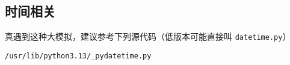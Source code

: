 \documentclass[a4paper,landscape,twocolumn]{ctexart}
\begin{document}
\subsection{时间相关}

真遇到这种大模拟，建议参考下列源代码（低版本可能直接叫 \texttt{datetime.py}）

\texttt{/usr/lib/python3.13/\_pydatetime.py}

%

%
\end{document}
